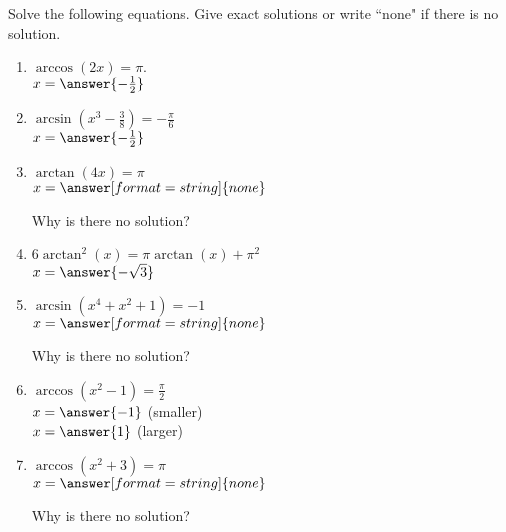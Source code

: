 \documentclass{ximera}
\author{Elizabeth Campolongo}
\begin{document}
\begin{exercise}
Solve the following equations. Give exact solutions or write ``none" if there is no solution. 
%
\begin{enumerate}

\item $\arccos(2x) = \pi.$\\
$x = \answer{-\frac{1}{2}}$

\item $\arcsin(x^3 - \frac{3}{8}) = -\frac{\pi}{6}$\\
$x = \answer{-\frac{1}{2}}$

\item $\arctan(4x) = \pi$\\
$x = \answer[format=string]{none}$
\begin{exercise}
Why is there no solution?
\begin{multipleChoice}
\end{multipleChoice}
\end{exercise}

\item $6\arctan^2(x)=\pi \arctan(x) + \pi^2$\\
$x = \answer{-\sqrt{3}}$

\item $\arcsin(x^4+x^2+1) = -1$ \\
$x = \answer[format=string]{none}$
\begin{exercise}
Why is there no solution?
\begin{multipleChoice}
\end{multipleChoice}
\end{exercise}

\item $\arccos(x^2-1) = \frac{\pi}{2}$ \\
$x = \answer{-1}$ (smaller)\\
$x = \answer{1}$ (larger)

\item $\arccos(x^2+3) = \pi$ \\
$x = \answer[format=string]{none}$
\begin{exercise}
Why is there no solution?
\begin{multipleChoice}
\end{multipleChoice}
\end{exercise}

\end{enumerate}

\end{exercise}
\end{document}

